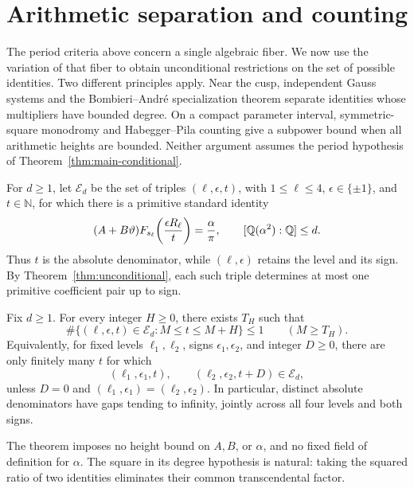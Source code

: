\section{Arithmetic separation and counting}
\label{sec:C-density}

The period criteria above concern a single algebraic fiber.  We now use
the variation of that fiber to obtain unconditional restrictions on the
set of possible identities.  Two different principles apply.  Near the
cusp, independent Gauss systems and the Bombieri--Andr\'e specialization
theorem separate identities whose multipliers have bounded degree.
On a compact parameter interval, symmetric-square monodromy and
Habegger--Pila counting give a subpower bound when all arithmetic heights
are bounded.  Neither argument assumes the period hypothesis of
Theorem~\ref{thm:main-conditional}.

For $d\geq1$, let $\mathscr E_d$ be the set of triples
$(\ell,\epsilon,t)$, with $1\leq\ell\leq4$, $\epsilon\in\{\pm1\}$,
and $t\in\mathbb N$, for which there is a primitive standard identity
\begin{equation}\label{rev:eq:exceptional-occurrence}
 (A+B\vartheta)F_{s_\ell}\!\left(\frac{\epsilon R_\ell}{t}\right)
       =\frac{\alpha}{\pi},
 \qquad [\mathbb Q(\alpha^2):\mathbb Q]\leq d.
\end{equation}
Thus $t$ is the absolute denominator, while $(\ell,\epsilon)$ retains
the level and its sign.  By Theorem~\ref{thm:unconditional}, each such
triple determines at most one primitive coefficient pair up to sign.

\begin{theorem}
\label{thm:C-absolute-gaps}
Fix $d\geq1$.  For every integer $H\geq0$, there exists $T_H$ such that
\[
 \#\{(\ell,\epsilon,t)\in\mathscr E_d:
                      M\leq t\leq M+H\}\leq1
 \qquad(M\geq T_H).
\]
Equivalently, for fixed levels $\ell_1,\ell_2$, signs
$\epsilon_1,\epsilon_2$, and integer $D\geq0$, there are only finitely many
$t$ for which
\[
 (\ell_1,\epsilon_1,t),\qquad
 (\ell_2,\epsilon_2,t+D)\in\mathscr E_d,
\]
unless $D=0$ and $(\ell_1,\epsilon_1)=(\ell_2,\epsilon_2)$.
In particular, distinct absolute denominators have gaps tending to
infinity, jointly across all four levels and both signs.
\end{theorem}

The theorem imposes no height bound on $A,B$, or $\alpha$, and no fixed
field of definition for $\alpha$.  The square in its degree hypothesis
is natural: taking the squared ratio of two identities eliminates
their common transcendental factor.

